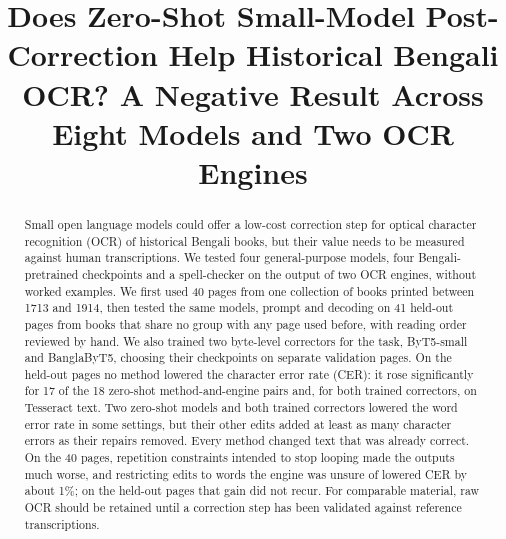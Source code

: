 \documentclass[conference]{IEEEtran}
\begin{document}
\title{Does Zero-Shot Small-Model Post-Correction Help Historical Bengali OCR? A Negative Result Across Eight Models and Two OCR Engines}

\author{
}

\maketitle

\begin{abstract}
Small open language models could offer a low-cost correction step for optical character recognition (OCR) of historical Bengali books, but their value needs to be measured against human transcriptions. We tested four general-purpose models, four Bengali-pretrained checkpoints and a spell-checker on the output of two OCR engines, without worked examples. We first used 40 pages from one collection of books printed between 1713 and 1914, then tested the same models, prompt and decoding on 41 held-out pages from books that share no group with any page used before, with reading order reviewed by hand. We also trained two byte-level correctors for the task, ByT5-small and BanglaByT5, choosing their checkpoints on separate validation pages. On the held-out pages no method lowered the character error rate (CER): it rose significantly for 17 of the 18 zero-shot method-and-engine pairs and, for both trained correctors, on Tesseract text. Two zero-shot models and both trained correctors lowered the word error rate in some settings, but their other edits added at least as many character errors as their repairs removed. Every method changed text that was already correct. On the 40 pages, repetition constraints intended to stop looping made the outputs much worse, and restricting edits to words the engine was unsure of lowered CER by about 1\%; on the held-out pages that gain did not recur. For comparable material, raw OCR should be retained until a correction step has been validated against reference transcriptions.
\end{abstract}
\end{document}
